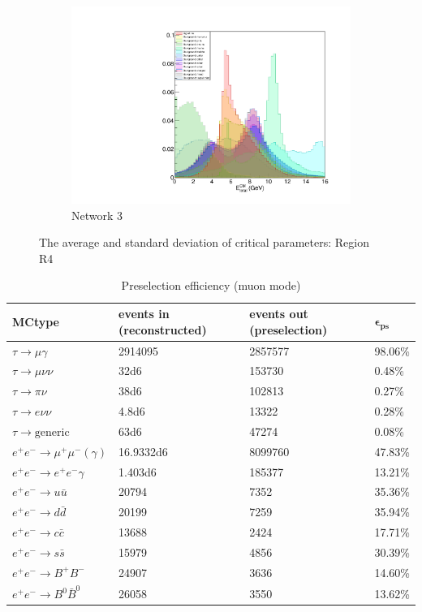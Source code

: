 \documentclass[12pt]{thesis}  %
\begin{document}
\begin{figure}
\begin{subfigure}[b]{0.475\textwidth}
            \includegraphics[width=\textwidth]{images/test.pdf}
            \caption[]%
            {{\small Network 3}}    
            \label{fig:mean and std of net34}
        \end{subfigure}
                \caption[ The average and standard deviation of critical parameters ]
        {\small The average and standard deviation of critical parameters: Region R4} 
        \end{figure}


\begin{table}[h]
\centering
\begin{tabular}{llll}
\textbf{MCtype} & \textbf{events in (reconstructed)} & \textbf{events out (preselection)} & $\mathbf{\epsilon_{\text{ps}}}$\\ \hline
\rowcolor[HTML]{EFEFEF}
$\tau\to\mu\gamma$ & 2914095 & 2857577 & 98.06\%	\\
$\tau\to\mu\nu\nu$ & \num{32d6} & 153730 & 0.48\%\\
$\tau\to\pi\nu$ & \num{38d6} & 102813 & 0.27\%\\
$\tau\to e\nu\nu$ & \num{4.8d6} & 13322 & 0.28\%\\
$\tau\to\text{generic}$ & \num{63d6} & 47274 & 0.08\%\\
$e^+ e^-\to\mu^+\mu^-(\gamma)$ & \num{16.9332d6} & 8099760 & 47.83\%	\\
$e^+ e^-\to e^+e^-\gamma$ & \num{1.403d6} & 185377 & 13.21\%	\\
$e^+ e^-\to u\bar{u}$ & 20794 & 7352 & 35.36\%	\\
$e^+ e^-\to d\bar{d}$ & 20199 & 7259 & 35.94\%	\\
$e^+ e^-\to c\bar{c}$ & 13688 & 2424 & 17.71\%	\\
$e^+ e^-\to s\bar{s}$ & 15979 & 4856 & 30.39\%	\\
$e^+ e^-\to B^+B^-$ & 24907 & 3636 & 14.60\%	\\
$e^+ e^-\to B^0 \bar{B}^0$ & 26058 & 3550 & 13.62\%
\end{tabular}
\caption{Preselection efficiency (muon mode)}
\label{my-label}
\end{table}
\end{document}
